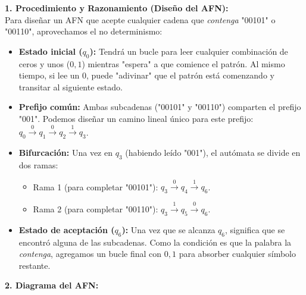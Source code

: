 \documentclass[12pt]{article}
\begin{document}
\textbf{1. Procedimiento y Razonamiento (Diseño del AFN):} \\
Para diseñar un AFN que acepte cualquier cadena que \textit{contenga} "00101" o "00110", aprovechamos el no determinismo:
\begin{itemize}
    \item \textbf{Estado inicial ($q_0$):} Tendrá un bucle para leer cualquier combinación de ceros y unos ($0,1$) mientras "espera" a que comience el patrón. Al mismo tiempo, si lee un $0$, puede "adivinar" que el patrón está comenzando y transitar al siguiente estado.
    \item \textbf{Prefijo común:} Ambas subcadenas ("00101" y "00110") comparten el prefijo "001". Podemos diseñar un camino lineal único para este prefijo: $q_0 \xrightarrow{0} q_1 \xrightarrow{0} q_2 \xrightarrow{1} q_3$.
    \item \textbf{Bifurcación:} Una vez en $q_3$ (habiendo leído "001"), el autómata se divide en dos ramas:
    \begin{itemize}
        \item Rama 1 (para completar "00101"): $q_3 \xrightarrow{0} q_4 \xrightarrow{1} q_6$.
        \item Rama 2 (para completar "00110"): $q_3 \xrightarrow{1} q_5 \xrightarrow{0} q_6$.
    \end{itemize}
    \item \textbf{Estado de aceptación ($q_6$):} Una vez que se alcanza $q_6$, significa que se encontró alguna de las subcadenas. Como la condición es que la palabra la \textit{contenga}, agregamos un bucle final con $0,1$ para absorber cualquier símbolo restante.
\end{itemize}

\vspace{0.5cm}

\textbf{2. Diagrama del AFN:}
\end{document}

